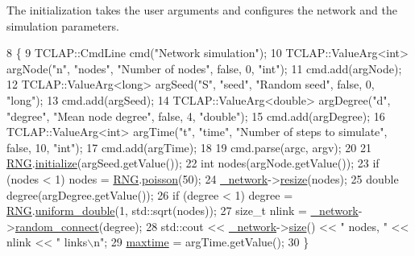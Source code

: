 The initialization takes the user arguments and configures the network and the simulation parameters. 
\begin{DoxyCode}
8                                                  \{
9     TCLAP::CmdLine cmd(\textcolor{stringliteral}{"Network simulation"});
10     TCLAP::ValueArg<int> argNode(\textcolor{stringliteral}{"n"}, \textcolor{stringliteral}{"nodes"}, \textcolor{stringliteral}{"Number of nodes"}, \textcolor{keyword}{false}, 0, \textcolor{stringliteral}{"int"});
11     cmd.add(argNode);
12     TCLAP::ValueArg<long> argSeed(\textcolor{stringliteral}{"S"}, \textcolor{stringliteral}{"seed"}, \textcolor{stringliteral}{"Random seed"}, \textcolor{keyword}{false}, 0, \textcolor{stringliteral}{"long"});
13     cmd.add(argSeed);
14     TCLAP::ValueArg<double> argDegree(\textcolor{stringliteral}{"d"}, \textcolor{stringliteral}{"degree"}, \textcolor{stringliteral}{"Mean node degree"}, \textcolor{keyword}{false}, 4, \textcolor{stringliteral}{"double"});
15     cmd.add(argDegree);
16     TCLAP::ValueArg<int> argTime(\textcolor{stringliteral}{"t"}, \textcolor{stringliteral}{"time"}, \textcolor{stringliteral}{"Number of steps to simulate"}, \textcolor{keyword}{false}, 10, \textcolor{stringliteral}{"int"});
17     cmd.add(argTime);
18 
19     cmd.parse(argc, argv);
20 
21     \mbox{\hyperlink{main_8cpp_aa68627d02426951087dcb2ed1f32099c}{RNG}}.\mbox{\hyperlink{classRandomNumbers_a9ee407185ec3f4e1a165edadb42c38e6}{initialize}}(argSeed.getValue());
22     \textcolor{keywordtype}{int} nodes(argNode.getValue());
23     \textcolor{keywordflow}{if} (nodes < 1) nodes = \mbox{\hyperlink{main_8cpp_aa68627d02426951087dcb2ed1f32099c}{RNG}}.\mbox{\hyperlink{classRandomNumbers_a69e33058b8a923f9597cf13421d5fcd4}{poisson}}(50);
24     \mbox{\hyperlink{classSimulation_a5f1d8152b13bc4640c8a3fddcfe7eae9}{\_network}}->\mbox{\hyperlink{classNetwork_acbc93883d63221b1204055d7192c74e3}{resize}}(nodes);
25     \textcolor{keywordtype}{double} degree(argDegree.getValue());
26     \textcolor{keywordflow}{if} (degree < 1) degree = \mbox{\hyperlink{main_8cpp_aa68627d02426951087dcb2ed1f32099c}{RNG}}.\mbox{\hyperlink{classRandomNumbers_ae226c129494f9055ac37ed1af943d010}{uniform\_double}}(1, std::sqrt(nodes));
27     \textcolor{keywordtype}{size\_t} nlink = \mbox{\hyperlink{classSimulation_a5f1d8152b13bc4640c8a3fddcfe7eae9}{\_network}}->\mbox{\hyperlink{classNetwork_aab69fcd3971532b165c4a4ff7df4b81c}{random\_connect}}(degree);
28     std::cout << \mbox{\hyperlink{classSimulation_a5f1d8152b13bc4640c8a3fddcfe7eae9}{\_network}}->\mbox{\hyperlink{classNetwork_a41c54d12d861883170b5c5abca3a7bc8}{size}}() << \textcolor{stringliteral}{" nodes, "} << nlink << \textcolor{stringliteral}{" links\(\backslash\)n"};
29     \mbox{\hyperlink{classSimulation_a2db45338d73f8e7823eb85015532be23}{maxtime}} = argTime.getValue();
30 \}
\end{DoxyCode}
\mbox{\label{classSimulation_a261acbceff8d384ea12cb010798504b2}} 
